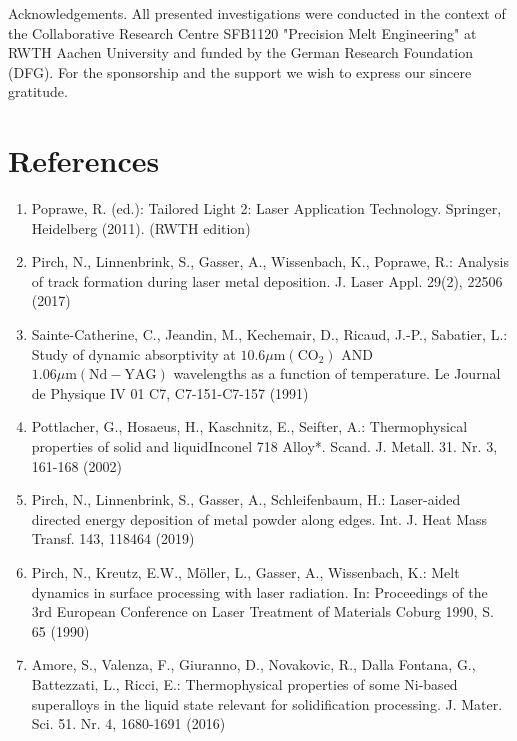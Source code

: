 \documentclass[10pt]{article}
\begin{document}
Acknowledgements. All presented investigations were conducted in the context of the Collaborative Research Centre SFB1120 "Precision Melt Engineering" at RWTH Aachen University and funded by the German Research Foundation (DFG). For the sponsorship and the support we wish to express our sincere gratitude.

\section*{References}
\begin{enumerate}
  \item Poprawe, R. (ed.): Tailored Light 2: Laser Application Technology. Springer, Heidelberg (2011). (RWTH edition)

  \item Pirch, N., Linnenbrink, S., Gasser, A., Wissenbach, K., Poprawe, R.: Analysis of track formation during laser metal deposition. J. Laser Appl. 29(2), 22506 (2017)

  \item Sainte-Catherine, C., Jeandin, M., Kechemair, D., Ricaud, J.-P., Sabatier, L.: Study of dynamic absorptivity at $10.6 \mu \mathrm{m}\left(\mathrm{CO}_{2}\right)$ AND $1.06 \mu \mathrm{m}(\mathrm{Nd}-\mathrm{YAG})$ wavelengths as a function of temperature. Le Journal de Physique IV 01 C7, C7-151-C7-157 (1991)

  \item Pottlacher, G., Hosaeus, H., Kaschnitz, E., Seifter, A.: Thermophysical properties of solid and liquidInconel 718 Alloy*. Scand. J. Metall. 31. Nr. 3, 161-168 (2002)

  \item Pirch, N., Linnenbrink, S., Gasser, A., Schleifenbaum, H.: Laser-aided directed energy deposition of metal powder along edges. Int. J. Heat Mass Transf. 143, 118464 (2019)

  \item Pirch, N., Kreutz, E.W., Möller, L., Gasser, A., Wissenbach, K.: Melt dynamics in surface processing with laser radiation. In: Proceedings of the 3rd European Conference on Laser Treatment of Materials Coburg 1990, S. 65 (1990)

  \item Amore, S., Valenza, F., Giuranno, D., Novakovic, R., Dalla Fontana, G., Battezzati, L., Ricci, E.: Thermophysical properties of some Ni-based superalloys in the liquid state relevant for solidification processing. J. Mater. Sci. 51. Nr. 4, 1680-1691 (2016)


\end{enumerate}
\end{document}
